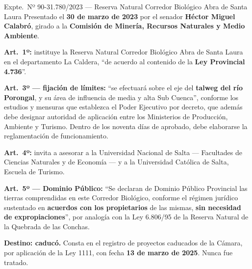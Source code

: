 \begin{ficha}{Expte.\ Nº 90-31.780/2023 --- Reserva Natural Corredor Biológico Abra de Santa Laura}
Presentado el \textbf{30 de marzo de 2023} por el senador \textbf{Héctor Miguel Calabró}, girado a la \textbf{Comisión de Minería, Recursos Naturales y Medio Ambiente}.

\textbf{Art.\ 1º:} instituye la Reserva Natural Corredor Biológico Abra de Santa Laura en el departamento La Caldera, ``de acuerdo al contenido de la \textbf{Ley Provincial 4.736}''.

\textbf{Art.\ 3º --- fijación de límites:} ``se efectuará sobre el eje del \textbf{talweg del río Porongal}, y su área de influencia de media y alta Sub Cuenca'', conforme los estudios y mensuras que establezca el Poder Ejecutivo por decreto, que además debe designar autoridad de aplicación entre los Ministerios de Producción, Ambiente y Turismo. Dentro de los noventa días de aprobado, debe elaborarse la reglamentación de funcionamiento.

\textbf{Art.\ 4º:} invita a asesorar a la Universidad Nacional de Salta --- Facultades de Ciencias Naturales y de Economía --- y a la Universidad Católica de Salta, Escuela de Turismo.

\textbf{Art.\ 5º --- Dominio Público:} ``Se declaran de Dominio Público Provincial las tierras comprendidas en este Corredor Biológico, conforme el régimen jurídico sustentado en \textbf{acuerdos con los propietarios} de las mismas, \textbf{sin necesidad de expropiaciones}'', por analogía con la Ley 6.806/95 de la Reserva Natural de la Quebrada de las Conchas.

\textbf{Destino: caducó.} Consta en el registro de proyectos caducados de la Cámara, por aplicación de la Ley 1111, con fecha \textbf{13 de marzo de 2025}. Nunca fue tratado.
\end{ficha}

